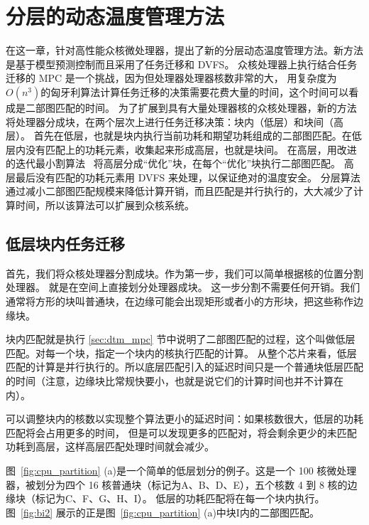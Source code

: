 
\chapter{分层的动态温度管理方法}\label{sec:new_method}

在这一章，针对高性能众核微处理器，提出了新的分层动态温度管理方法。新方法是基于模型预测控制而且采用了任务迁移和 DVFS。
众核处理器上执行结合任务迁移的 MPC 是一个挑战，因为但处理器处理器核数非常的大，
用复杂度为$O(n^{3})$的匈牙利算法计算任务迁移的决策需要花费大量的时间，这个时间可以看成是二部图匹配的时间。
为了扩展到具有大量处理器核的众核处理器，新的方法将处理器分成块，在两个层次上进行任务迁移决策：块内（低层）和块间（高层）。
首先在低层，也就是块内执行当前功耗和期望功耗组成的二部图匹配。在低层内没有匹配上的功耗元素，收集起来形成高层，也就是块间。
在高层，用改进的迭代最小割算法~\cite{Fidducia:DAC'82}  将高层分成“优化”块，在每个“优化”块执行二部图匹配。
高层最后没有匹配的功耗元素用 DVFS 来处理，以保证绝对的温度安全。
分层算法通过减小二部图匹配规模来降低计算开销，而且匹配是并行执行的，大大减少了计算时间，所以该算法可以扩展到众核系统。

\section{低层块内任务迁移}\label{sec:parts}

首先，我们将众核处理器分割成块。作为第一步，我们可以简单根据核的位置分割处理器。
就是在空间上直接划分处理器成块。
这一步分割不需要任何开销。我们通常将方形的块叫普通块，在边缘可能会出现矩形或者小的方形块，把这些称作边缘块。

块内匹配就是执行 \ref{sec:dtm_mpc} 节中说明了二部图匹配的过程，这个叫做低层匹配。对每一个块，指定一个块内的核执行匹配的计算。
从整个芯片来看，低层匹配的计算是并行执行的。所以底层匹配引入的延迟时间只是一个普通块低层匹配的时间（注意，边缘块比常规快要小，也就是说它们的计算时间也并不计算在内）。

可以调整块内的核数以实现整个算法更小的延迟时间：如果核数很大，低层的功耗匹配将会占用更多的时间，
但是可以发现更多的匹配对，将会剩余更少的未匹配功耗到高层，这样高层匹配处理时间就会减少。

图~\ref{fig:cpu_partition} (a)是一个简单的低层划分的例子。这是一个 100 核微处理器，被划分为四个 16 核普通块（标记为A、B、D、E），五个核数 4 到 8 核的边缘块（标记为C、F、G、H、I）。
低层的功耗匹配将在每一个块内执行。图~\ref{fig:bi2} 展示的正是图~\ref{fig:cpu_partition} (a)中块I内的二部图匹配。

